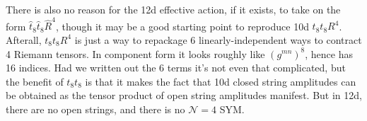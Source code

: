 There is also no reason for the 12d effective action, if it exists, to take on the form $\hat{t}_8\hat{t}_8 \hat{R}^4$, though it may be a good starting point to reproduce 10d $t_8t_8 R^4$.
Afterall, $t_8t_8 R^4$ is just a way to repackage 6 linearly-independent ways to contract 4 Riemann tensors.
In component form it looks roughly like $(g^{mn})^8$, hence has 16 indices.
Had we written out the 6 terms it's not even that complicated, but the benefit of $t_8t_8$ is that it makes the fact that 10d closed string amplitudes can be obtained as the tensor product of open string amplitudes manifest.
But in 12d, there are no open strings, and there is no $\mathcal{N} = 4$ SYM.












